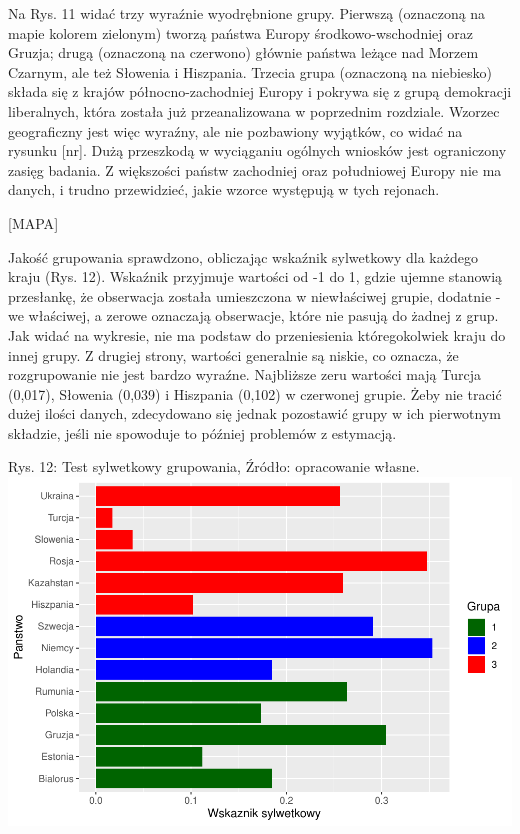 \documentclass[12pt]{article}
\begin{document}
Na Rys. 11 widać trzy wyraźnie wyodrębnione grupy. Pierwszą (oznaczoną na mapie kolorem zielonym) tworzą państwa Europy środkowo-wschodniej oraz Gruzja; drugą (oznaczoną na czerwono) głównie państwa leżące nad Morzem Czarnym, ale też Słowenia i Hiszpania. Trzecia grupa (oznaczoną na niebiesko) składa się z krajów północno-zachodniej Europy i pokrywa się z grupą demokracji liberalnych, która została już przeanalizowana w poprzednim rozdziale. Wzorzec geograficzny jest więc wyraźny, ale nie pozbawiony wyjątków, co widać na rysunku {[}nr{]}. Dużą przeszkodą w wyciąganiu ogólnych wniosków jest ograniczony zasięg badania. Z większości państw zachodniej oraz południowej Europy nie ma danych, i trudno przewidzieć, jakie wzorce występują w tych rejonach.

{[}MAPA{]}

Jakość grupowania sprawdzono, obliczając wskaźnik sylwetkowy dla każdego kraju (Rys. 12). Wskaźnik przyjmuje wartości od -1 do 1, gdzie ujemne stanowią przesłankę, że obserwacja została umieszczona w niewłaściwej grupie, dodatnie - we właściwej, a zerowe oznaczają obserwacje, które nie pasują do żadnej z grup. Jak widać na wykresie, nie ma podstaw do przeniesienia któregokolwiek kraju do innej grupy. Z drugiej strony, wartości generalnie są niskie, co oznacza, że rozgrupowanie nie jest bardzo wyraźne. Najbliższe zeru wartości mają Turcja (0,017), Słowenia (0,039) i Hiszpania (0,102) w czerwonej grupie. Żeby nie tracić dużej ilości danych, zdecydowano się jednak pozostawić grupy w ich pierwotnym składzie, jeśli nie spowoduje to później problemów z estymacją.

Rys. 12: Test sylwetkowy grupowania, Źródło: opracowanie własne.
\includegraphics{text_ASA_files/figure-latex/silhouette-1.pdf}
\end{document}
